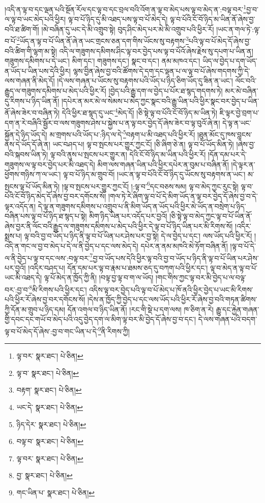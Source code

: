 །འདི་ན་ལྟ་བ་དང་ལྡན་པའི་སྔོན་རོལ་དང་ལྟ་བ་དང་བྲལ་བའི་འོག་ན་ལྟ་བ་མེད་པས་ལྟ་བ་མེད་ན་:བལྟ་བར་\footnote{ལྟ་བར་  སྣར་ཐང་།  པེ་ཅིན། }བྱ་བ་ལ་ལྟ་བ་ཡང་མེད་པའི་ཕྱིར། ལྟ་བ་པོ་ཉིད་དུ་མི་འཐད་པས་ལྟ་བ་པོ་མེད་དེ། ལྟ་བ་པོའི་ངོ་བོ་ཉིད་མ་ཡིན་ནོ་ཞེས་བྱ་བའི་ཐ་ཚིག་གོ། །མེ་བཞིན་དུ་ཡང་དེ་མི་འགྲུབ་སྟེ། བུད་ཤིང་མེད་པར་མེ་མི་འགྲུབ་པའི་ཕྱིར་རོ། །ཡང་ན་གལ་ཏེ་:ལྟ་བ་པོ་\footnote{ལྟ་བ་  སྣར་ཐང་།  པེ་ཅིན། }ཡོད་ན་ལྟ་བ་པོ་ཡིན་ནོ་ཞེ་ན་ཡང་གྲངས་ཅན་དག་གིས་ཡོངས་སུ་བརྟགས་\footnote{བརྟག་  སྣར་ཐང་།  པེ་ཅིན། }པའི་ལྟ་བ་པོ་མེད་དོ་ཞེས་བྱ་བའི་ཚིག་གི་ལྷག་མ་སྟེ། འདི་ལ་གཟུགས་དམིགས་ཤིང་ལྟ་བར་བྱེད་པས་ལྟ་བ་པོའོ་ཞེས་རྗེས་སུ་དཔག་པ་ཡིན་ན། གཟུགས་དམིགས་པ་དེ་ཡང་། མིག་དང་། གཟུགས་དང་། སྣང་བ་དང་། ནམ་མཁའ་དང་། ཡིད་ལ་བྱེད་པ་དག་ཡོད་ན་ཡོད་པ་ཡིན་པས་དེའི་ཕྱིར། ལྷས་བྱིན་ཞེས་བྱ་བའི་ཚོགས་དེ་དག་དང་ལྡན་པ་ལ་ལྟ་བ་པོ་ཞེས་གདགས་ཀྱི་དེ་ལས་གཞན་ནི་མེད་དོ། །དེ་ལས་གཞན་པ་ཡོངས་སུ་བརྟགས་པའི་ཡོད་པ་ཉིད་ཅིག་ཡོད་དུ་ཟིན་ན་ཡང་། ལོང་བའི་རྒྱུད་ལ་གཟུགས་དམིགས་པ་མེད་པའི་ཕྱིར་རོ། །བྱེད་པའི་རྒྱུ་དག་ལ་བྱེད་པ་པོར་ཐ་སྙད་གདགས་ཏེ། མར་མེ་བཞིན་དུ་རིགས་པ་ཉིད་ཡིན་ནོ། །དཔེར་ན་མར་མེ་ལ་སེམས་པ་མེད་ཀྱང་སྣང་བའི་རྒྱུ་ཡིན་པའི་ཕྱིར་སྣང་བར་བྱེད་པ་ཡིན་ནོ་ཞེས་ཟེར་བ་བཞིན་ཏེ། དེའི་ཕྱིར་ཐ་སྙད་དུ་ཡང་\footnote{ཡང་དེ་  སྣར་ཐང་།  པེ་ཅིན། }མེད་དོ། །ཅི་སྟེ་ལྟ་བ་པོའི་ངོ་བོ་ཉིད་མ་ཡིན་ཏེ། ཇི་ལྟར་བྱེ་བྲག་པ་དག་ན་རེ་བཞིའི་སྦྱོར་བ་ལས་གཟུགས་ཤེས་པ་སྐྱེས་པ་ན་ལྟ་བར་བྱེད་དོ་ཞེས་ཟེར་བ་ལྟ་བུའོ་ཞེ་ན། དེ་ལྟ་ན་ཡང་སྐྱོན་དེ་ཉིད་ཡོད་དེ། མ་གྲགས་པའི་ཡོད་པ་:ཉིད་ལ་དེ་\footnote{ཉིད་དེར་  སྣར་ཐང་།  པེ་ཅིན། }བརྟག་པ་མི་འཐད་པའི་ཕྱིར་རོ། །ཐུན་མོང་དུ་ཁས་བླངས་ནས་དེ་ཡོད་དོ་ཞེ་ན། ཡང་བཤད་པ། ལྟ་བ་སྤངས་པར་གྱུར་ཀྱང་ངོ། །ཅི་ཞིག་ཅེ་ན། ལྟ་བ་པོ་ཡོད་མིན་ཏེ། །ཞེས་བྱ་བའི་སྐབས་ཡིན་ཏེ། ལྟ་བའི་ནུས་པ་སྤངས་པར་གྱུར་ན། དེའི་ངོ་བོ་ཉིད་མ་ཡིན་པའི་ཕྱིར་རོ། །དོན་དམ་པར་དེ་གཟུགས་ལ་ལྟ་བར་བྱེད་པར་མི་འཐད་དེ། མིག་ལས་གཞན་ཡིན་པའི་ཕྱིར་དཔེར་ན་བུམ་པ་བཞིན་ནོ། །དེ་ལྟར་ན་ཕྱོགས་གཉིས་ཀ་ལ་ཡང་། ལྟ་བ་པོ་ཉིད་མ་གྲུབ་བོ། །ཡང་ན་ལྟ་བ་པོའི་ངོ་བོ་ཉིད་དུ་ཡོངས་སུ་བརྟགས་ན་ཡང་། མ་སྤངས་ལྟ་པོ་ཡོད་མིན་ཏེ། །ལྟ་བ་སྤངས་པར་གྱུར་ཀྱང་ངོ། །:ལྟ་བ་\footnote{བལྟ་བ་  སྣར་ཐང་།  པེ་ཅིན། }དང་བཅས་སམ། ལྟ་བ་མེད་ཀྱང་རུང་སྟེ། ལྟ་བ་པོའི་ངོ་བོ་ཉིད་མེད་དོ་ཞེས་བྱ་བར་དགོངས་སོ། །གལ་ཏེ་རེ་ཞིག་ལྟ་བ་པོ་དེ་མིག་ཡོད་ན་ལྟ་བར་བྱེད་དོ་ཞེས་བྱ་བ་དེ་ལྟར་འདོད་ན། དེ་ལྟ་ན་གཟུགས་དམིགས་པ་འགྲུབ་པ་ནི་མིག་ཡོད་ན་ཡོད་པའི་ཕྱིར་མེ་ཡོད་ན་བསྲེག་པ་ཉིད་བཞིན་པས་ལྟ་བ་པོ་ཉིད་ཐ་སྙད་པ་སྟེ། མིག་ཉིད་ཡིན་པར་འདོད་པར་བྱའོ། །ཅི་སྟེ་ལྟ་བ་མེད་ཀྱང་ལྟ་བ་པོ་ཡིན་ནོ་ཞེས་བྱར་ནི་ལོང་བའི་རྒྱུད་ལ་གཟུགས་དམིགས་པ་མེད་པའི་ཕྱིར་དེ་ལྟ་བ་པོ་ཉིད་ཡིན་པར་མི་རིགས་སོ། །འདིར་སྨྲས་པ། ལྟ་བའི་བྱ་བ་ཡོད་པ་ཉིད་ནི་ལྟ་བ་པོ་ཡིན་པར་ཤེས་པར་བྱ་སྟེ། དེ་ལ་བྱེད་པ་དང་། ལས་ཡོད་པའི་ཕྱིར་རོ། །འདི་ན་གང་ལ་བྱ་བ་མེད་པ་དེ་ལ་ནི་བྱེད་པ་དང་ལས་མེད་དེ། དཔེར་ན་ནམ་མཁའི་མེ་ཏོག་བཞིན་ནོ། །ལྟ་བ་པོ་དེ་ལ་ནི་བྱེད་པ་ལྟ་བ་དང་ལས་:བལྟ་བར་\footnote{ལྟ་བར་  སྣར་ཐང་།  པེ་ཅིན། }བྱ་བ་ཡོད་པས་དེའི་ཕྱིར་ལྟ་བའི་བྱ་བ་ཡོད་པ་ཉིད་ནི་ལྟ་བ་པོ་ཡིན་པར་ཤེས་པར་བྱའོ། །འདིར་བཤད་པ། དོན་དམ་པར་ལྟ་བ་རྣམ་པ་ཐམས་ཅད་དུ་བཀག་པའི་ཕྱིར་དང་། ལྟ་བ་མེད་ན་ལྟ་བ་པོ་ཡང་མི་འཐད་དེ། ལྟ་པོ་མེད་ན་ཁྱོད་ཀྱི་ནི། །བལྟ་བྱ་ལྟ་བ་ག་ལ་ཡོད། །གང་གིས་ཀྱང་ལྟ་བར་མི་བྱེད་པ་ལ་བལྟ་བར་:བྱ་བ་\footnote{བྱ་  སྣར་ཐང་།  པེ་ཅིན། }མི་རིགས་པའི་ཕྱིར་དང་། འདིས་ལྟ་བར་བྱེད་པའི་ལྟ་བ་པོ་མེད་པ་ཁོ་ནའི་ཕྱིར་བྱེད་པ་ཡང་མི་རིགས་པའི་ཕྱིར་རོ་ཞེས་བྱ་བར་དགོངས་སོ། །དེས་ན་ཁྱོད་ཀྱི་བྱེད་པ་དང་ལས་ཡོད་པའི་ཕྱིར་རོ་ཞེས་བྱ་བའི་གཏན་ཚིགས་ཀྱི་དོན་མ་གྲུབ་པ་ཉིད་དམ། དོན་འགལ་བ་ཉིད་ཡིན་ནོ། །རང་གི་སྡེ་པ་དག་ལས། ཁ་ཅིག་ན་རེ། རྒྱུ་དང་རྐྱེན་གཞན་གྱི་དབང་དང་གཡོ་བ་མེད་པའི་འདུ་བྱེད་དག་ལ་མིག་ལྟ་བར་མི་བྱེད་དོ་ཞེས་བྱ་བ་དང་། དེ་ལས་གཞན་པའི་བདག་ལྟ་བ་པོ་མེད་དོ་ཞེས་:བྱ་བ་གང་ཡིན་པ་དེ་\footnote{གང་ཡིན་པ་  སྣར་ཐང་།  པེ་ཅིན། }ནི་རིགས་ཀྱི། 